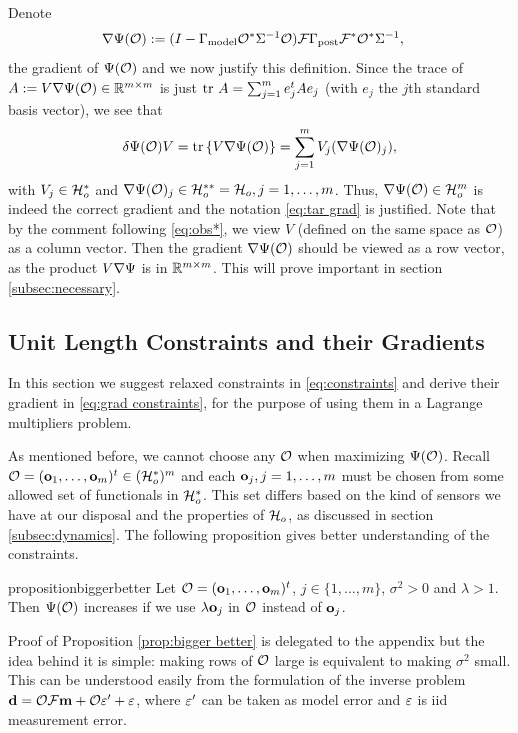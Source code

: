 \documentclass{amsart}
\numberwithin{equation}{section}
\begin{document}
Denote
\begin{align}\label{eq:tar grad}
  \nabla \Psi(\mathcal{O}) &:= (I - \Gamma_{\textup{model}} \mathcal{O}^* \Sigma^{-1} \mathcal{O}) \mathcal{F}
  \Gamma_{\textup{post}} \mathcal{F}^* \mathcal{O}^*\Sigma^{-1},
\end{align}
the gradient of $\Psi (\mathcal{O} )$ and we now justify this definition.
Since the trace of $A := V \nabla \Psi(\mathcal{O}) \in \mathbb{R}^{m \times m}$ is
just $\textup{tr}\ A = \sum_{j=1}^m e_j^t A e_j$ (with $e_j$ the $j$th standard
basis vector), we see that
\begin{align*}
  \delta \Psi(\mathcal{O})V = \textup{tr}\left \{V \nabla \Psi(\mathcal{O}) \right \} = \sum_{j=1}^m
  V_j(\nabla \Psi(\mathcal{O})_j),
\end{align*}
with $V_j \in \mathcal{H}_o^*$ and $\nabla \Psi(\mathcal{O})_j \in \mathcal{H}_o^{**} =
\mathcal{H}_o, j=1,\dots,m$. Thus, $\nabla \Psi( \mathcal{O} ) \in \mathcal{H}_o^m$ is indeed
the correct gradient and the notation \eqref{eq:tar grad} is
justified. Note that by the comment following \eqref{eq:obs*}, we view
$V$ (defined on the same space as $\mathcal{O}$) as a column vector. Then the
gradient $\nabla \Psi(\mathcal{O})$ should be viewed as a row vector, as the
product $V \nabla \Psi$ is in $\mathbb{R}^{m \times m}$. This will prove
important in section \ref{subsec:necessary}.

\subsection{Unit Length Constraints and their Gradients}\label{subsec:unit length}
In this section we suggest relaxed constraints in
\eqref{eq:constraints} and derive their gradient in \eqref{eq:grad
  constraints}, for the purpose of using them in a Lagrange
multipliers problem.

As mentioned before, we cannot choose any $\mathcal{O}$ when maximizing
$\Psi(\mathcal{O})$. Recall $\mathcal{O} = (\mathbf{o}_1,\dots,\mathbf{o}_m)^t \in
(\mathcal{H}_o^*)^m$ and each $\mathbf{o}_j,j=1,\dots,m$ must be chosen from some
allowed set of functionals in $\mathcal{H}_o^*$. This set differs based on the
kind of sensors we have at our disposal and the properties of $\mathcal{H}_o$,
as discussed in section \ref{subsec:dynamics}. The following
proposition gives better understanding of the constraints.
\begin{restatable*}{proposition}{biggerbetter}\label{prop:bigger better}
  Let $\mathcal{O} = (\mathbf{o}_1,\dots,\mathbf{o}_m)^t$, $j \in \{1,\dots,m\}$, $\sigma^2
  > 0$ and $\lambda > 1$. Then $\Psi(\mathcal{O})$ increases if we use
  $\lambda \mathbf{o}_j$ in $\mathcal{O}$ instead of $\mathbf{o}_j$.
\end{restatable*}
Proof of Proposition \ref{prop:bigger better} is delegated to the
appendix but the idea behind it is simple: making rows of $\mathcal{O}$ large
is equivalent to making $\sigma^2$ small. %
This can be understood easily from the formulation of the inverse
problem $\mathbf{d} = \mathcal{O} \mathcal{F} \mathbf{m} + \mathcal{O} \varepsilon' + \varepsilon$, where $\varepsilon'$
can be taken as model error and $\varepsilon$ is iid measurement error.
\end{document}
